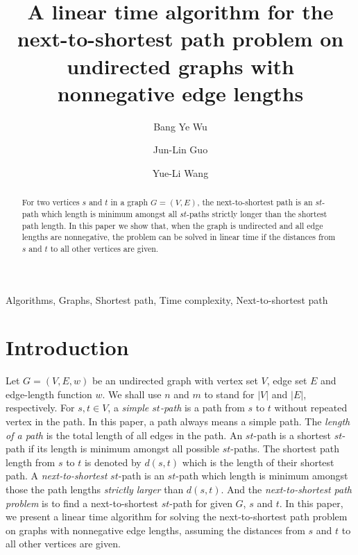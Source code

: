\documentclass[review]{elsarticle}
\begin{document}
\begin{frontmatter}
\title{A linear time algorithm for the next-to-shortest path problem on undirected graphs with nonnegative edge lengths}
\author[bang]{Bang Ye Wu}
\author[yl]{Jun-Lin Guo}
\author[yl]{Yue-Li Wang}
\address[bang]{Dept. of Computer Science and Information Engineering,
National Chung Cheng University, ChiaYi, Taiwan 621, R.O.C.}
\address[yl]{Department of Information Management, National Taiwan University of Science and Technology, Taipei, Taiwan, R.O.C.}

\begin{abstract}
For two vertices $s$ and $t$ in a graph $G=(V,E)$, the
next-to-shortest path is an $st$-path which length is minimum
amongst all $st$-paths strictly longer than the shortest path
length. In this paper we show that, when the graph is undirected and
all edge lengths are nonnegative,  the problem can be solved in
linear time if the distances from $s$ and $t$ to all other vertices
are given.
\end{abstract}

\begin{keyword}
Algorithms, Graphs, Shortest path, Time complexity, Next-to-shortest
path
\end{keyword}
\end{frontmatter}

\section{Introduction}
Let $G=(V,E,w)$ be an undirected graph with vertex set $V$, edge set
$E$ and edge-length function $w$. We shall use $n$ and $m$ to stand
for $|V|$ and $|E|$, respectively. For $s,t\in V$, a {\em simple
$st$-path} is a path from $s$ to $t$ without repeated vertex in the
path. In this paper, a path always means a simple path. The {\em
length of a path} is the total length of all edges in the path. An
$st$-path is a shortest $st$-path if its length is minimum amongst
all possible $st$-paths. The shortest path length from $s$ to $t$ is
denoted by $d(s,t)$ which is the length of their shortest path. A
\emph{next-to-shortest} $st$-path is an $st$-path which length is
minimum amongst those the path lengths \emph{strictly larger} than
$d(s,t)$. And the {\em next-to-shortest path problem} is to find a
next-to-shortest $st$-path for given $G$, $s$ and $t$. In this
paper, we present a linear time algorithm for solving the
next-to-shortest path problem on graphs with nonnegative edge
lengths, assuming the distances from $s$ and $t$ to all other
vertices are given.
\end{document}
